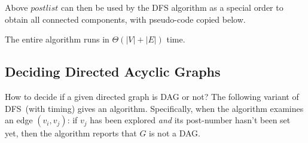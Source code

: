 Above $postlist$ can then be used by the DFS algorithm as a special order to obtain all connected components, with pseudo-code copied below.

\begin{algorithmblock}[0.8\textwidth]
	\xxx
	\xxx
	\xxx
	\xxx
	\xxx
	\xxx
\end{algorithmblock}

\begin{algorithmblock}[0.8\textwidth]
	\xxx
	\xxx
	\xxx
	\xxx
\end{algorithmblock}


The entire algorithm runs in $\Theta(|V| + |E|)$ time.

\subsection*{Deciding Directed Acyclic Graphs}

How to decide if a given directed graph is DAG or not?
The following variant of DFS~(with timing) gives an algorithm.
Specifically, when the algorithm examines an edge $(v_i, v_j)$:
if $v_j$ has been explored \emph{and} its post-number hasn't been set yet,
then the algorithm reports that $G$ is not a DAG.

\begin{algorithmblock}[0.8\textwidth]
	\xxx
	\xxx
	\xxx
	\xxx
	\xxx
	\xxx
\end{algorithmblock}

\begin{algorithmblock}[0.8\textwidth]
	\xxx
	\xxx
	\xxx
	\xxx
	\xxx
	\xxx
	\aac {\textcolor{red}{else if ($post[j] = -1$): report ``$G$ is not a DAG''};}\xxx
	\xxx
	\xxx
\end{algorithmblock}

